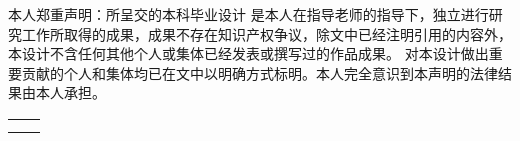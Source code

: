 
\begin{declarationzh}
		
本人郑重声明：所呈交的本科毕业设计 \uline{ } 是本人在指导老师的指导下，独立进行研究工作所取得的成果，成果不存在知识产权争议，除文中已经注明引用的内容外，本设计不含任何其他个人或集体已经发表或撰写过的作品成果。
对本设计做出重要贡献的个人和集体均已在文中以明确方式标明。本人完全意识到本声明的法律结果由本人承担。
	
	\vspace{30pt}
	\begin{tabular}{ll}
		\hspace{240pt} \makebox[4em][s]{作者签名：罗明贵} & \underline{\makebox[100pt][c]{  }} \\
		\hspace{240pt} \makebox[4em][s]{日\qquad 期:}	 &
		\underline{\makebox[100pt][c]{\qquad2024年\quad12月\quad26日 }} \\
	\end{tabular}

	
	
\end{declarationzh}